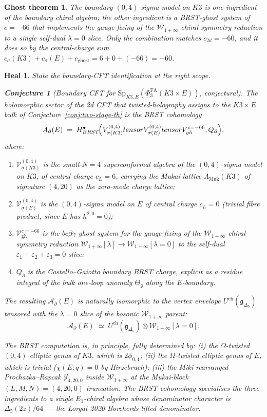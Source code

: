 \documentclass[11pt]{article}
\newtheorem{conjecture}[theorem]{Conjecture}
\newtheorem*{ghost}{Ghost theorem}
\newtheorem*{heal}{Heal}
\providecommand{\Eone}{E_1}
\providecommand{\cA}{\mathcal{A}}
\providecommand{\cV}{\mathcal{V}}
\providecommand{\cW}{\mathcal{W}}
\providecommand{\cY}{\mathcal{Y}}
\providecommand{\fg}{\mathfrak{g}}
\providecommand{\Sp}{\mathrm{Sp}}
\providecommand{\Muk}{\mathrm{Muk}}
\begin{document}
\begin{ghost}
\emph{The boundary $(0,4)$-sigma model on $K3$ is one ingredient of the
boundary chiral algebra; the other ingredient is a BRST-ghost system of
$c = -66$ that implements the gauge-fixing of the $\cW_{1+\infty}$
chiral-symmetry reduction to a single self-dual $\lambda = 0$ slice.
Only the combination matches $c_{2d} = -60$, and it does so by the
central-charge sum
$c_\sigma(K3) + c_\sigma(E) + c_{\mathrm{ghost}}
= 6 + 0 + (-66) = -60$.}
\end{ghost}

\begin{heal}
State the boundary-CFT identification at the right scope.
\begin{conjecture}[Boundary CFT for $\Sp_{K3,E}(\Phi^{\mathrm{FA}}_3(K3\times E))$,
  conjectural]
\label{conj:boundary-cft}
The holomorphic sector of the 2d CFT that twisted-holography assigns
to the $K3\times E$ bulk of Conjecture~\ref{conj:two-stage-th} is the
BRST cohomology
\[
  \cA_\partial(E)
  \;=\;
  H^\bullet_{\mathrm{BRST}}\!\Bigl(
    \cV_{\sigma(K3)}^{(0,4)}
    \otimes \cV_{\sigma(E)}^{(0,4)}
    \otimes \cV_{\mathrm{gh}}^{c=-66},
    Q_\partial
  \Bigr),
\]
where:
\begin{enumerate}[leftmargin=2em]
\item $\cV_{\sigma(K3)}^{(0,4)}$ is the small-$N{=}4$ superconformal
algebra of the $(0,4)$-sigma model on $K3$, of central charge $c_L = 6$,
carrying the Mukai lattice $\Lambda_\Muk(K3)$ of signature $(4,20)$ as
the zero-mode charge lattice;
\item $\cV_{\sigma(E)}^{(0,4)}$ is the $(0,4)$-sigma model on $E$ of
central charge $c_L = 0$ (trivial fibre product, since $E$ has
$h^{2,0} = 0$);
\item $\cV_{\mathrm{gh}}^{c=-66}$ is the $bc\beta\gamma$ ghost system
for the gauge-fixing of the $\cW_{1+\infty}$ chiral-symmetry reduction
$\cW_{1+\infty}[\lambda] \to \cW_{1+\infty}[\lambda=0]$ to the self-dual
$\varepsilon_1+\varepsilon_2+\varepsilon_3 = 0$ slice;
\item $Q_\partial$ is the Costello--Gaiotto boundary BRST charge,
explicit as a residue integral of the bulk one-loop anomaly
$\Theta_\fg$ along the $E$-boundary.
\end{enumerate}
The resulting $\cA_\partial(E)$ is naturally isomorphic to the vertex
envelope $U^{\mathrm{ch}}(\fg_{\Delta_5})$ tensored with the
$\lambda = 0$ slice of the bosonic $\cW_{1+\infty}$ parent:
\[
  \cA_\partial(E) \;\simeq\;
  U^{\mathrm{ch}}(\fg_{\Delta_5})
  \otimes\cW_{1+\infty}[\lambda = 0].
\]
\end{conjecture}

The BRST computation is, in principle, fully determined by:
(i) the $\Omega$-twisted $(0,4)$-elliptic genus of $K3$, which is
$2\phi_{0,1}$; (ii) the $\Omega$-twisted elliptic genus of $E$, which
is trivial ($\chi(E;q) = 0$ by Hirzebruch); (iii) the Miki-rearranged
Prochazka--Rapcak $\cY_{4,20,0}$ inside $\cW_{1+\infty}$ at the
Mukai-block $(L,M,N) = (4,20,0)$ truncation. The BRST cohomology
specialises the three ingredients to a single $\Eone$-chiral algebra
whose denominator character is $\Delta_5(2z)/64$ --- the Lorgat 2020
Borcherds-lifted denominator.
\end{heal}
\end{document}
